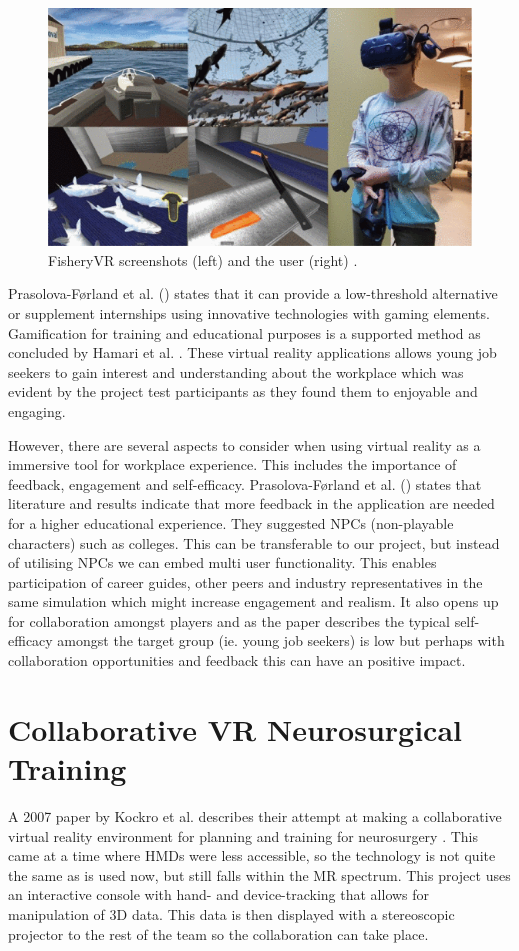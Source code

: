  \begin{figure}[!h]
     \centering
     \includegraphics[width=.7\textwidth]{./fig/related_work/fisheryVR.png}
     \caption{FisheryVR screenshots (left) and the user (right) \cite{prasolova2019empowering}.}
     \label{fig:FisheryVR}
 \end{figure}

Prasolova-Førland et al. (\citeyear{prasolova2019empowering}) states that it can provide a low-threshold alternative or supplement internships using innovative technologies with gaming elements. Gamification for training and educational purposes is a supported method as concluded by Hamari et al. \cite{hamari2014does}. These virtual reality applications allows young job seekers to gain interest and understanding about the workplace which was evident by the project test participants as they found them to enjoyable and engaging. 

However, there are several aspects to consider when using virtual reality as a immersive tool for workplace experience. This includes the importance of feedback, engagement and self-efficacy. Prasolova-Førland et al. (\citeyear{prasolova2019empowering}) states that literature and results indicate that more feedback in the application are needed for a higher educational experience. They suggested NPCs (non-playable characters) such as colleges. This can be transferable to our project, but instead of utilising NPCs we can embed multi user functionality. This enables participation of career guides, other peers and industry representatives in the same simulation which might increase engagement and realism. It also opens up for collaboration amongst players and as the paper describes the typical self-efficacy amongst the target group (ie. young job seekers) is low but perhaps with collaboration opportunities and feedback this can have an positive impact.  




\section{Collaborative VR Neurosurgical Training}
A 2007 paper by Kockro et al. describes their attempt at making a collaborative virtual reality environment for planning and training for neurosurgery \cite{kockro2007collaborative}. This came at a time where HMDs were less accessible, so the technology is not quite the same as is used now, but still falls within the MR spectrum. This project uses an interactive console with hand- and device-tracking that allows for manipulation of 3D data. This data is then displayed with a stereoscopic projector to the rest of the team so the collaboration can take place.

